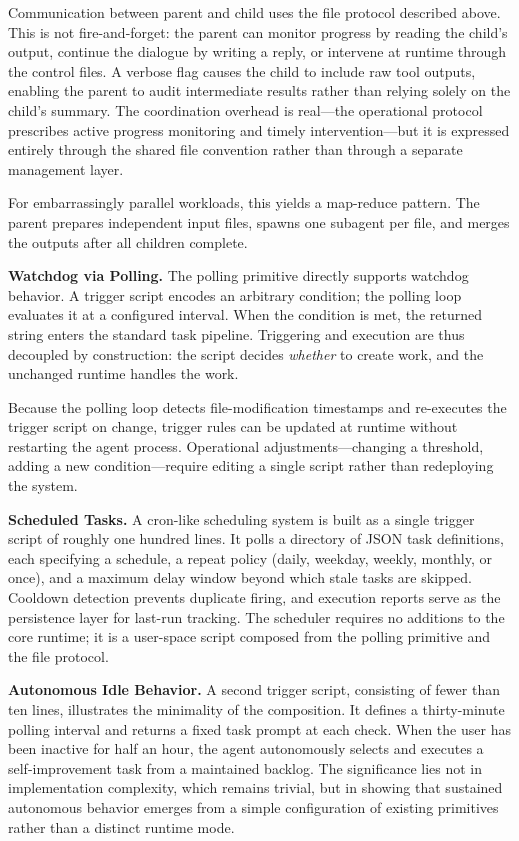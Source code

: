 Communication between parent and child uses the file protocol described above. This is not fire-and-forget: the parent can monitor progress by reading the child's output, continue the dialogue by writing a reply, or intervene at runtime through the control files. A verbose flag causes the child to include raw tool outputs, enabling the parent to audit intermediate results rather than relying solely on the child's summary. The coordination overhead is real—the operational protocol prescribes active progress monitoring and timely intervention—but it is expressed entirely through the shared file convention rather than through a separate management layer.

For embarrassingly parallel workloads, this yields a map-reduce pattern. The parent prepares independent input files, spawns one subagent per file, and merges the outputs after all children complete.

\textbf{Watchdog via Polling.}
The polling primitive directly supports watchdog behavior. A trigger script encodes an arbitrary condition; the polling loop evaluates it at a configured interval. When the condition is met, the returned string enters the standard task pipeline. Triggering and execution are thus decoupled by construction: the script decides \emph{whether} to create work, and the unchanged runtime handles the work.

Because the polling loop detects file-modification timestamps and re-executes the trigger script on change, trigger rules can be updated at runtime without restarting the agent process. Operational adjustments—changing a threshold, adding a new condition—require editing a single script rather than redeploying the system.

\textbf{Scheduled Tasks.}
A cron-like scheduling system is built as a single trigger script of roughly one hundred lines. It polls a directory of JSON task definitions, each specifying a schedule, a repeat policy (daily, weekday, weekly, monthly, or once), and a maximum delay window beyond which stale tasks are skipped. Cooldown detection prevents duplicate firing, and execution reports serve as the persistence layer for last-run tracking. The scheduler requires no additions to the core runtime; it is a user-space script composed from the polling primitive and the file protocol.

\textbf{Autonomous Idle Behavior.}
A second trigger script, consisting of fewer than ten lines, illustrates the minimality of the composition. It defines a thirty-minute polling interval and returns a fixed task prompt at each check. When the user has been inactive for half an hour, the agent autonomously selects and executes a self-improvement task from a maintained backlog. The significance lies not in implementation complexity, which remains trivial, but in showing that sustained autonomous behavior emerges from a simple configuration of existing primitives rather than a distinct runtime mode.

